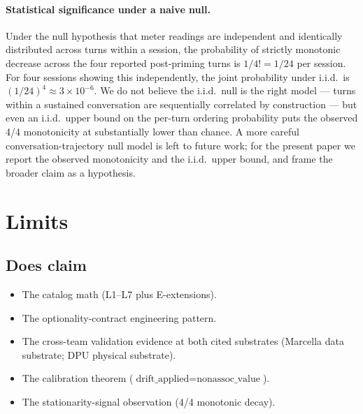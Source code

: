 \documentclass[11pt,letterpaper]{article}
\begin{document}
\paragraph{Statistical significance under a naive null.}
Under the null hypothesis that meter readings are independent and
identically distributed across turns within a session, the
probability of strictly monotonic decrease across the four reported
post-priming turns is $1/4! = 1/24$ per session. For four sessions
showing this independently, the joint probability under i.i.d.\ is
$(1/24)^4 \approx 3 \times 10^{-6}$. We do not believe the i.i.d.\
null is the right model --- turns within a sustained conversation
are sequentially correlated by construction --- but even an i.i.d.\
upper bound on the per-turn ordering probability puts the observed
4/4 monotonicity at substantially lower than chance. A more careful
conversation-trajectory null model is left to future work; for the
present paper we report the observed monotonicity and the i.i.d.\
upper bound, and frame the broader claim as a hypothesis.


\section{Limits}
\label{sec:limits}

\subsection{Does claim}
\begin{itemize}[nosep]
\item The catalog math (L1--L7 plus E-extensions).
\item The optionality-contract engineering pattern.
\item The cross-team validation evidence at both cited substrates
  (Marcella data substrate; DPU physical substrate).
\item The calibration theorem
  ($\text{drift\_applied} = \text{nonassoc\_value}$).
\item The stationarity-signal observation (4/4 monotonic decay).
\end{itemize}
\end{document}
